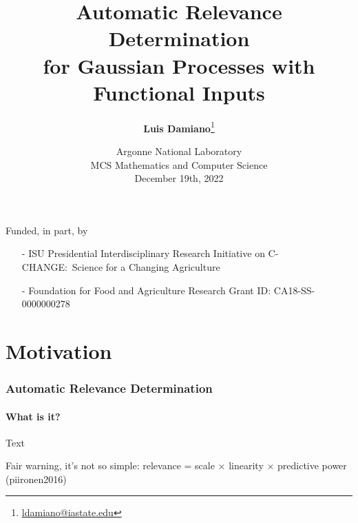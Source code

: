 \documentclass{snedecorbeamer}
\title{\textbf{Automatic Relevance Determination} \\
  for Gaussian Processes with Functional Inputs}
\author[Damiano et al]{
  \textbf{Luis Damiano}\footnote[2]{
    \tiny{\href{mailto:ldamiano@iastate.edu}{ldamiano@iastate.edu}}
  }}
\institute{
  Department of Statistics, Iowa State University
}
\date[December 19th, 2022]{
  \tiny{Argonne National Laboratory \\
    MCS Mathematics and Computer Science} \\
  December 19th, 2022}
\begin{document}
\begin{frame}
  \titlepage{}
  {
    \tiny{
      Funded, in part, by
      \begin{itemize}
      \item[-] ISU Presidential Interdisciplinary
	Research Initiative on C-CHANGE:~Science for a Changing
	Agriculture
      \item[-] Foundation for Food and Agriculture Research
	Grant ID: CA18-SS-0000000278
      \end{itemize}
    }
  }
\end{frame}

%
\section{Motivation}

\begin{frame}
  \frametitle{Automatic Relevance Determination}
  \framesubtitle{What is it?}

  Text

  Fair warning, it's not so simple: relevance = scale $\times$ linearity $\times$ predictive
power (piironen2016)
\end{frame}
\end{document}
